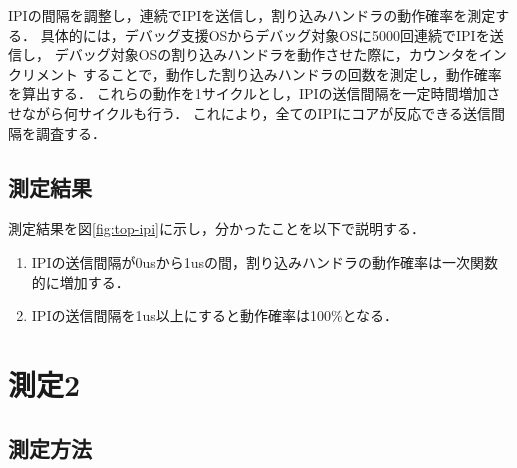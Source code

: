 \documentclass[12pt]{jsarticle}
\begin{document}
IPIの間隔を調整し，連続でIPIを送信し，割り込みハンドラの動作確率を測定する．
具体的には，デバッグ支援OSからデバッグ対象OSに5000回連続でIPIを送信し，
デバッグ対象OSの割り込みハンドラを動作させた際に，カウンタをインクリメント
することで，動作した割り込みハンドラの回数を測定し，動作確率を算出する．
これらの動作を1サイクルとし，IPIの送信間隔を一定時間増加させながら何サイクルも行う．
これにより，全てのIPIにコアが反応できる送信間隔を調査する．

\subsection{測定結果}\label{result-ipi-limit}
測定結果を図\ref{fig:top-ipi}に示し，分かったことを以下で説明する．

\begin{enumerate}
    \item IPIの送信間隔が0usから1usの間，割り込みハンドラの動作確率は一次関数
        的に増加する．
    \item IPIの送信間隔を1us以上にすると動作確率は100\%となる．
\end{enumerate}

\section{測定2}

\subsection{測定方法}\label{method-measure}
\end{document}

